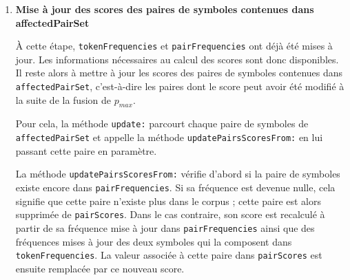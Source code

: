 \documentclass[12pt,a4paper]{report}
\begin{document}
\begin{enumerate}
\begin{enumerate}[label=\alph*)]
	 	Cette modification peut entraîner la disparition de certaines occurrences de paires de symboles consécutifs qui existaient avant la mise à jour du \texttt{corpus}. Leurs fréquences doivent donc être diminuées dans \texttt{pairFrequencies}, et les couples de références correspondants doivent être supprimés de \texttt{pairPositions}.
	 	
	 	D'autre part, de nouvelles paires de symboles consécutifs apparaissent à cause de l'apparition du nouveau symbole. Ces nouvelles paires correspondent principalement aux paires formées entre le nouveau symbole et ses voisins dans la liste doublement chaînée. Elles doivent être ajoutées dans \texttt{pairFrequencies} et \texttt{pairPositions}.
	 	
	 	Pour effectuer ces mises à jour efficacement, il n'est pas nécessaire de parcourir tous les nœuds de la liste doublement chaînée. Les informations stockées dans \texttt{pairPositions} permettent d'accéder directement aux nœuds contenant les occurrences de $p_{max}$. À partir de ces nœuds, il est possible d'effectuer la fusion, d'identifier les paires dont la fréquence diminue et de déterminer les nouvelles paires créées après la fusion.
	 	
	 	Dans \texttt{ WordPieceTrain}, la méthode \texttt{update:} réalise ces mises à jour en appelant la méthode \texttt{update:} héritée de la classe \texttt{BPETrain}. Cette dernière effectue la modification de la liste doublement chaînée ainsi que la mise à jour de \texttt{pairFrequencies} et \texttt{pairPositions}. La description détaillée de cette méthode est présentée dans le chapitre consacré à l'optimisation de BPE.
	 	
	 	\item \textbf{Mise à jour des scores des paires de symboles contenues dans affectedPairSet}
	 	
	 	À cette étape, \texttt{tokenFrequencies} et \texttt{pairFrequencies} ont déjà été mises à jour. Les informations nécessaires au calcul des scores sont donc disponibles. Il reste alors à mettre à jour les scores des paires de symboles contenues dans \texttt{affectedPairSet}, c'est-à-dire les paires dont le score peut avoir été modifié à la suite de la fusion de $p_{max}$.
	 	
	 	Pour cela, la méthode \texttt{update:} parcourt chaque paire de symboles de \texttt{affectedPairSet} et appelle la méthode \texttt{updatePairsScoresFrom:} en lui passant cette paire en paramètre.
	 	
	 	La méthode \texttt{updatePairsScoresFrom:} vérifie d'abord si la paire de symboles existe encore dans \texttt{pairFrequencies}. Si sa fréquence est devenue nulle, cela signifie que cette paire n'existe plus dans le corpus ; cette paire est alors supprimée de \texttt{pairScores}. Dans le cas contraire, son score est recalculé à partir de sa fréquence mise à jour dans \texttt{pairFrequencies} ainsi que des fréquences mises à jour des deux symboles qui la composent dans \texttt{tokenFrequencies}. La valeur associée à cette paire dans \texttt{pairScores} est ensuite remplacée par ce nouveau score.
	 	

\end{enumerate}
\end{enumerate}
\end{document}
